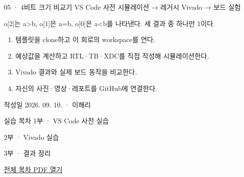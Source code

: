 
\renewcommand{\labonehome}{\hyperlink{legacy-05-contents}{\contentsbutton}}
\renewcommand{\legacySource}[1]{}
\providecommand{\terminalbox}[1]{\par\vspace{0.15cm}{\setlength{\fboxsep}{7pt}\colorbox{black}{\parbox{\dimexpr\textwidth-14pt\relax}{\color{white}\ttfamily\fontsize{7}{9}\selectfont #1}}}\par\vspace{0.15cm}}

\begingroup
\renewcommand{\small}{\fontsize{9}{11}\selectfont}
\begin{frame}{05 · 4비트 크기 비교기}\relax
\small
VS Code 사전 시뮬레이션 → 레거시 Vivado → 보드 실험\par\vspace{0.22cm}o[2]는 a>b, o[1]은 a=b, o[0]은 a<b를 나타낸다. 세 결과 중 하나만 1이다.\par\begin{enumerate}\setlength{\itemsep}{0.22cm}
\item 템플릿을 clone하고 이 회로의 workspace를 연다.
\item 예상값을 계산하고 RTL·TB·XDC를 직접 작성해 시뮬레이션한다.
\item Vivado 결과와 실제 보드 동작을 비교한다.
\item 자신의 사진·영상·레포트를 GitHub에 연결한다.
\end{enumerate}
작성일 2026. 09. 10. · 이해리\par
\end{frame}

\begin{frame}[label=legacy-05-contents]{실습 목차}\relax
\small
1부 · VS Code 사전 실습\par{}\par\vspace{0.2cm}
\par\vspace{0.4cm}
2부 · Vivado 실습\par{}\par\vspace{0.4cm}
3부 · 결과 정리\par{}\par\vspace{0.35cm}
\href{04.LAB1_00_CONTENTS.pdf}{전체 목차 PDF 열기}
\end{frame}

